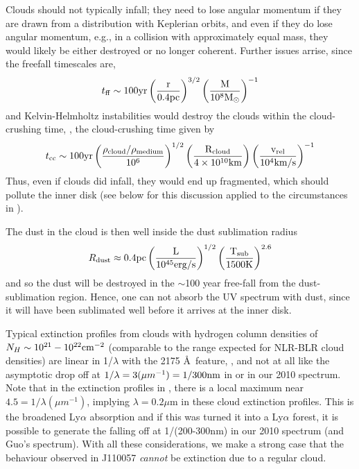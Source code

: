 \documentclass[11pt,a4paper]{article}
\begin{document}
Clouds should not typically infall; they need to lose angular momentum
if they are drawn from a distribution with Keplerian orbits, and even
if they do lose angular momentum, e.g., in a collision with
approximately equal mass, they would likely be either destroyed or no
longer coherent. Further issues arrise, since the freefall timescales
are,
\begin{equation}
    t_{{\rm ff}}   \sim 100   \rm{yr}  \left(\frac{r}{0.4\rm{pc}}\right)^{3/2} 
                                            \left(\frac{M}{10^{8}M_{\odot}}\right)^{-1}
\end{equation}
and Kelvin-Helmholtz instabilities would destroy the clouds within the
cloud-crushing time, \citep[e.g., ][]{Nagakura2008, Hopkins2013,
Shiokawa2015, Bae2016}, the cloud-crushing time given by
\begin{equation}
    t_{\rm cc} \sim 100\rm{yr} \left(\frac{\rho_{cloud}/\rho_{medium}}{10^{6}}\right)^{1/2} 
                                            \left(\frac{R_{\rm cloud}}{4 \times 10^{10}\rm{km}}\right) 
                                            \left(\frac{v_{\rm rel}}{10^{4}\rm{km/s}}\right)^{-1}
\end{equation}
Thus, even if clouds did infall, they would end up fragmented, which
should pollute the inner disk (see below for this discussion applied
to the circumstances in \citet{Guo2016}).

The dust in the cloud is then well inside the dust sublimation radius
\begin{equation}
    R_{\rm dust} \approx 0.4\rm{pc}\left(\frac{L}{10^{45}\rm{erg/s}}\right)^{1/2}
                                                   \left(\frac{T_{\rm sub}}{1500\rm{K}}\right)^{2.6}
\end{equation}
and so the dust will be destroyed in the $\sim$100 year free-fall from
the dust-sublimation region. Hence, one can not absorb the UV spectrum
with dust, since it will have been sublimated well before it arrives
at the inner disk.

Typical extinction profiles from clouds with hydrogen column densities
of $N_{H} \sim 10^{21}-10^{22} \rm{cm}^{-2}$ (comparable to the range
expected for NLR-BLR cloud densities) are linear in 
1/$\lambda$ with the 2175 \AA\ feature, \citep[e.g., Figure 4
of][]{Gordon2003}, and not at all like the asymptotic drop off at
$1/\lambda=3 (\mu m^{-1})=1/300\rm{nm}$ in \citet{Guo2016} or in our
2010 spectrum. Note that in the extinction profiles in
\citet{Gordon2003}, there is a local maximum near $4.5=1/\lambda (\mu
m^{-1})$, implying $\lambda=0.2\mu$m  in these
cloud extinction profiles. This is the broadened Ly$\alpha$ absorption
and if this was turned it into a Ly$\alpha$ forest, it is possible to
generate the falling off at 1/(200-300nm) in our 2010 spectrum (and
Guo's spectrum). With all these considerations, we make a strong case
that the behaviour observed in J110057 \emph{cannot} be extinction due
to a regular cloud.
\end{document}
